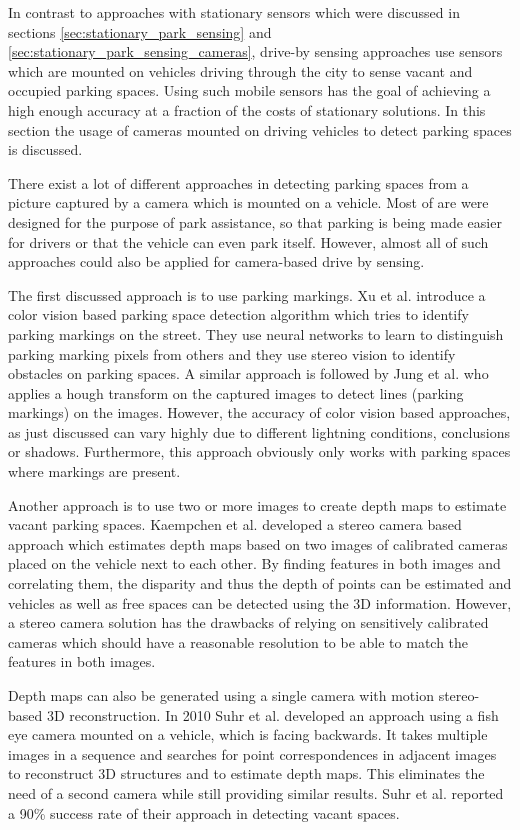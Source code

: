 In contrast to approaches with stationary sensors which were discussed in sections \ref{sec:stationary_park_sensing} and \ref{sec:stationary_park_sensing_cameras}, drive-by sensing approaches use sensors which are mounted on vehicles driving through the city to sense vacant and occupied parking spaces. Using such mobile sensors has the goal of achieving a high enough accuracy at a fraction of the costs of stationary solutions. In this section the usage of cameras mounted on driving vehicles to detect parking spaces is discussed.

There exist a lot of different approaches in detecting parking spaces from a picture captured by a camera which is mounted on a vehicle. Most of are were designed for the purpose of park assistance, so that parking is being made easier for drivers or that the vehicle can even park itself. However, almost all of such approaches could also be applied for camera-based drive by sensing.

The first discussed approach is to use parking markings. Xu et al. \cite{Xu2000} introduce a color vision based parking space detection algorithm which tries to identify parking markings on the street. They use neural networks to learn to distinguish parking marking pixels from others and they use stereo vision to identify obstacles on parking spaces. A similar approach is followed by Jung et al. \cite{Jung2006} who applies a hough transform on the captured images to detect lines (parking markings) on the images. However, the accuracy of color vision based approaches, as just discussed can vary highly due to different lightning conditions, conclusions or shadows. Furthermore, this approach obviously only works with parking spaces where markings are present.

Another approach is to use two or more images to create depth maps to estimate vacant parking spaces. Kaempchen et al. \cite{Kaempchen2002} developed a stereo camera based approach which estimates depth maps based on two images of calibrated cameras placed on the vehicle next to each other. By finding features in both images and correlating them, the disparity and thus the depth of points can be estimated and vehicles as well as free spaces can be detected using the 3D information. However, a stereo camera solution has the drawbacks of relying on sensitively calibrated cameras which should have a reasonable resolution to be able to match the features in both images.

Depth maps can also be generated using a single camera with motion stereo-based 3D reconstruction. In 2010 Suhr et al. \cite{Suhr2010} developed an approach using a fish eye camera mounted on a vehicle, which is facing backwards. It takes multiple images in a sequence and searches for point correspondences in adjacent images to reconstruct 3D structures and to estimate depth maps. This eliminates the need of a second camera while still providing similar results. Suhr et al. reported a 90\% success rate of their approach in detecting vacant spaces.

